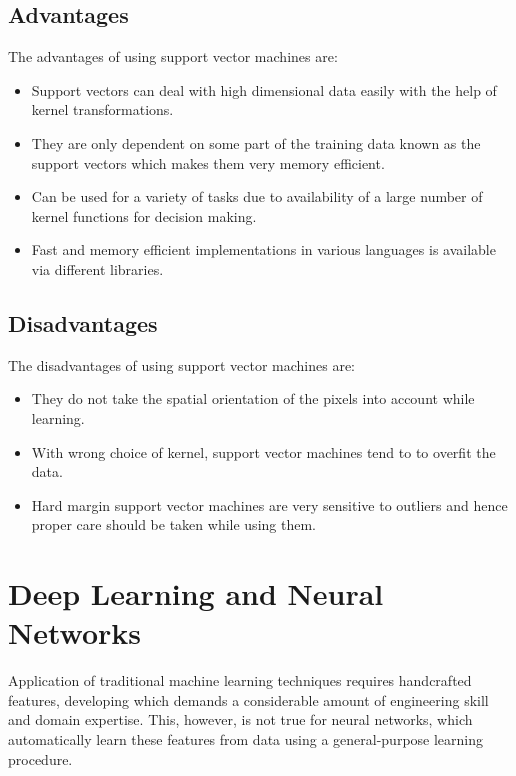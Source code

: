 \documentclass[12pt, a4paper]{report}
\begin{document}
\subsection{Advantages}
The advantages of using support vector machines are:
\begin{itemize}
\item Support vectors can deal with high dimensional data easily with the help of kernel transformations.
\item They are only dependent on some part of the training data known as the support vectors which makes them very memory efficient.
\item Can be used for a variety of tasks due to availability of a large number of kernel functions for decision making.
\item Fast and memory efficient implementations in various languages is available via different libraries.
\end{itemize}
\subsection{Disadvantages}
The disadvantages of using support vector machines are:
\begin{itemize}
\item They do not take the spatial orientation of the pixels into account while learning.
\item With wrong choice of kernel, support vector machines tend to to overfit the data.
\item Hard margin support vector machines are very sensitive to outliers and hence proper care should be taken while using them.
\end{itemize}

\newpage
\section{Deep Learning and Neural Networks}
Application of traditional machine learning techniques requires handcrafted features, developing which demands a considerable amount of engineering skill and domain expertise. This, however, is not true for neural networks, which automatically learn these features from data using a general-purpose learning procedure.\cite{eyesky, cs231n} 
\end{document}
